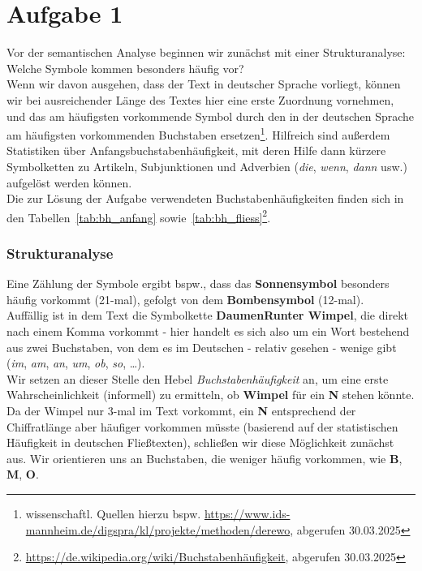 \chapter{Aufgabe 1}

\noindent
Vor der semantischen Analyse beginnen wir zunächst mit einer Strukturanalyse: Welche Symbole kommen besonders häufig vor?\\
Wenn wir davon ausgehen, dass der Text in deutscher Sprache vorliegt, können wir bei ausreichender Länge des Textes hier eine erste Zuordnung vornehmen, und das am häufigsten vorkommende Symbol durch den in der deutschen Sprache am häufigsten vorkommenden Buchstaben ersetzen\footnote{
    wissenschaftl. Quellen hierzu bspw. \url{https://www.ids-mannheim.de/digspra/kl/projekte/methoden/derewo}, abgerufen 30.03.2025
}.
Hilfreich sind außerdem Statistiken über Anfangsbuchstabenhäufigkeit, mit deren Hilfe dann kürzere Symbolketten zu Artikeln, Subjunktionen und Adverbien (\textit{die}, \textit{wenn}, \textit{dann} usw.) aufgelöst werden können.\\
Die zur Lösung der Aufgabe verwendeten Buchstabenhäufigkeiten finden sich in den Tabellen~\ref{tab:bh_anfang} sowie~\ref{tab:bh_fliess}\footnote{
    \url{https://de.wikipedia.org/wiki/Buchstabenhäufigkeit}, abgerufen 30.03.2025
}.\\

\subsection*{Strukturanalyse}
\noindent
Eine Zählung der Symbole ergibt bspw., dass das \textbf{Sonnensymbol} besonders häufig vorkommt (21-mal), gefolgt von dem \textbf{Bombensymbol} (12-mal).\\

\noindent
Auffällig ist in dem Text die Symbolkette \textbf{DaumenRunter Wimpel}, die direkt nach einem Komma vorkommt - hier handelt es sich also um ein Wort bestehend aus zwei Buchstaben, von dem es im Deutschen - relativ gesehen - wenige gibt (\textit{im}, \textit{am}, \textit{an}, \textit{um}, \textit{ob}, \textit{so}, \ldots).\\

\noindent
Wir setzen an dieser Stelle den Hebel \textit{Buchstabenhäufigkeit} an, um eine erste Wahrscheinlichkeit (informell) zu ermitteln, ob \textbf{Wimpel} für ein \textbf{N} stehen könnte.
Da der Wimpel nur 3-mal im Text vorkommt, ein \textbf{N} entsprechend der Chiffratlänge aber häufiger vorkommen müsste (basierend auf der statistischen Häufigkeit in deutschen Fließtexten), schließen wir diese Möglichkeit zunächst aus.
Wir orientieren uns an Buchstaben, die weniger häufig vorkommen, wie \textbf{B}, \textbf{M}, \textbf{O}.\\

